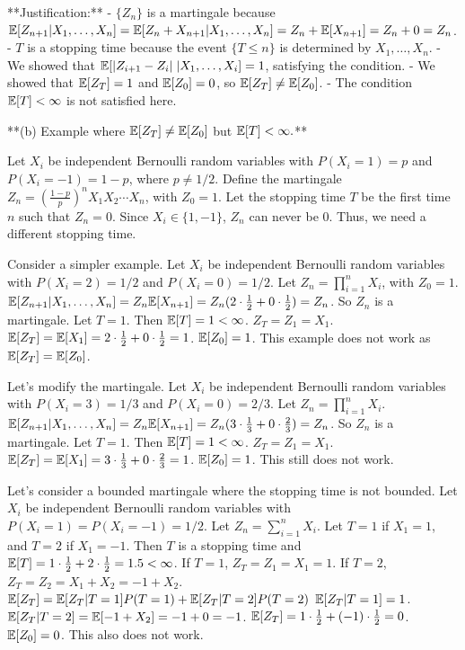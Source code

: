 \begin{enumerate}
\begin{shaded}
**Justification:**
- $\{Z_n\}$ is a martingale because $\mathbb{E}[Z_{n+1} | X_1, \ldots, X_n] = \mathbb{E}[Z_n + X_{n+1} | X_1, \ldots, X_n] = Z_n + \mathbb{E}[X_{n+1}] = Z_n + 0 = Z_n$.
- $T$ is a stopping time because the event $\{T \le n\}$ is determined by $X_1, \ldots, X_n$.
- We showed that $\mathbb{E}[|Z_{i+1}-Z_i| \; | X_1,\ldots,X_i] = 1$, satisfying the condition.
- We showed that $\mathbb{E}[Z_T] = 1$ and $\mathbb{E}[Z_0] = 0$, so $\mathbb{E}[Z_T] \neq \mathbb{E}[Z_0]$.
- The condition $\mathbb{E}[T] < \infty$ is not satisfied here.

**(b) Example where $\mathbb{E}[Z_T] \neq \mathbb{E}[Z_0]$ but $\mathbb{E}[T] < \infty.$**

Let $X_i$ be independent Bernoulli random variables with $P(X_i = 1) = p$ and $P(X_i = -1) = 1-p$, where $p \neq 1/2$.
Define the martingale $Z_n = (\frac{1-p}{p})^n X_1 X_2 \cdots X_n$, with $Z_0 = 1$.
Let the stopping time $T$ be the first time $n$ such that $Z_n = 0$. Since $X_i \in \{1, -1\}$, $Z_n$ can never be 0. Thus, we need a different stopping time.

Consider a simpler example. Let $X_i$ be independent Bernoulli random variables with $P(X_i = 2) = 1/2$ and $P(X_i = 0) = 1/2$.
Let $Z_n = \prod_{i=1}^n X_i$, with $Z_0 = 1$.
$\mathbb{E}[Z_{n+1} | X_1, \ldots, X_n] = Z_n \mathbb{E}[X_{n+1}] = Z_n (2 \cdot \frac{1}{2} + 0 \cdot \frac{1}{2}) = Z_n$. So $Z_n$ is a martingale.
Let $T = 1$. Then $\mathbb{E}[T] = 1 < \infty$.
$Z_T = Z_1 = X_1$.
$\mathbb{E}[Z_T] = \mathbb{E}[X_1] = 2 \cdot \frac{1}{2} + 0 \cdot \frac{1}{2} = 1$.
$\mathbb{E}[Z_0] = 1$.
This example does not work as $\mathbb{E}[Z_T] = \mathbb{E}[Z_0]$.

Let's modify the martingale.
Let $X_i$ be independent Bernoulli random variables with $P(X_i = 3) = 1/3$ and $P(X_i = 0) = 2/3$.
Let $Z_n = \prod_{i=1}^n X_i$.
$\mathbb{E}[Z_{n+1} | X_1, \ldots, X_n] = Z_n \mathbb{E}[X_{n+1}] = Z_n (3 \cdot \frac{1}{3} + 0 \cdot \frac{2}{3}) = Z_n$. So $Z_n$ is a martingale.
Let $T = 1$. Then $\mathbb{E}[T] = 1 < \infty$.
$Z_T = Z_1 = X_1$.
$\mathbb{E}[Z_T] = \mathbb{E}[X_1] = 3 \cdot \frac{1}{3} + 0 \cdot \frac{2}{3} = 1$.
$\mathbb{E}[Z_0] = 1$.
This still does not work.

Let's consider a bounded martingale where the stopping time is not bounded.
Let $X_i$ be independent Bernoulli random variables with $P(X_i = 1) = P(X_i = -1) = 1/2$.
Let $Z_n = \sum_{i=1}^n X_i$.
Let $T = 1$ if $X_1 = 1$, and $T = 2$ if $X_1 = -1$.
Then $T$ is a stopping time and $\mathbb{E}[T] = 1 \cdot \frac{1}{2} + 2 \cdot \frac{1}{2} = 1.5 < \infty$.
If $T=1$, $Z_T = Z_1 = X_1 = 1$.
If $T=2$, $Z_T = Z_2 = X_1 + X_2 = -1 + X_2$.
$\mathbb{E}[Z_T] = \mathbb{E}[Z_T | T=1]P(T=1) + \mathbb{E}[Z_T | T=2]P(T=2)$
$\mathbb{E}[Z_T | T=1] = 1$.
$\mathbb{E}[Z_T | T=2] = \mathbb{E}[-1 + X_2] = -1 + 0 = -1$.
$\mathbb{E}[Z_T] = 1 \cdot \frac{1}{2} + (-1) \cdot \frac{1}{2} = 0$.
$\mathbb{E}[Z_0] = 0$.
This also does not work.


\end{shaded}
\end{enumerate}
